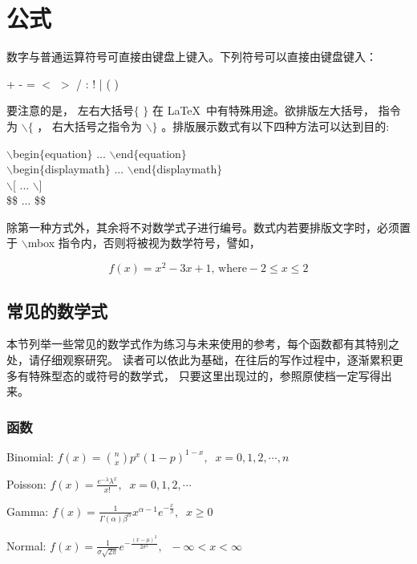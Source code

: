 
\chapter{公式}
\song\wuhao
数字与普通运算符号可直接由键盘上键入。下列符号可以直接由键盘键入：

        \begin{center}
                    + \;-\; =\; $<$\; $>$ \;/ \;:\; !\; | \;[\; ] \;(\; )\\
        \end{center}
		
要注意的是， 左右大括号$\{$ $\}$ 在 \LaTeX\ 中有特殊用途。欲排版左大括号， 指令为 $\backslash \{$ ，
右大括号之指令为 $\backslash \}$ 。排版展示数式有以下四种方法可以达到目的:
        \begin{center}
$\backslash$begin$\{$equation$\}$ ... $\backslash$end$\{$equation$\}$\\
$\backslash$begin$\{$displaymath$\}$ ... $\backslash$end$\{$displaymath$\}$\\
$\backslash$[ ... $\backslash$]\\
\$\$ ... \$\$
        \end{center}
除第一种方式外，其余将不对数学式子进行编号。数式内若要排版文字时，必须置于
$\backslash$mbox 指令内，否则将被视为数学符号，譬如，

$$f(x)=x^2-3x+1 \mbox{, where} -2 \leq x \leq 2$$
\section{常见的数学式}
本节列举一些常见的数学式作为练习与未来使用的参考，每个函数都有其特别之处，请仔细观察研究。
读者可以依此为基础，在往后的写作过程中，逐渐累积更多有特殊型态的或符号的数学式，
只要这里出现过的，参照原使档一定写得出来。

\subsection{函数}
  Binomial: $f(x)={n\choose x}p^x(1-p)^{1-x}, \;\; x=0,1,2,\cdots,n$ 
  
  Poisson: $f(x)=\frac{e^{-\lambda}\lambda^x}{x!}, \;\;  x=0,1,2,\cdots$ 
  
  Gamma: $f(x)=\frac{1}{\Gamma(\alpha)\beta^\alpha}x^{\alpha-1}e^{-\frac{x}{\beta}}, \;\; x\geq 0$ 
  
  Normal: $f(x)=\frac{1}{\sigma\sqrt{2\pi}}e^{-\frac{(x-\mu)^2}{2\sigma^2}}, \;\;  -\infty < x < \infty $
  
